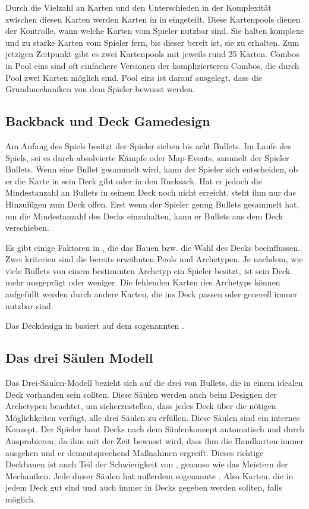 Durch die Vielzahl an Karten und den Unterschieden in der Komplexität zwischen diesen Karten werden Karten in \FF in  eingeteilt.
Diese Kartenpools dienen der Kontrolle, wann welche Karten vom Spieler nutzbar sind.
Sie halten komplexe und zu starke Karten vom Spieler fern, bis dieser bereit ist, sie zu erhalten.
Zum jetzigen Zeitpunkt gibt es zwei Kartenpools mit jeweils rund 25 Karten. Combos in Pool eins sind oft einfachere
Versionen der komplizierteren Combos, die durch Pool zwei Karten möglich sind.
Pool eins ist darauf ausgelegt, dass die Grundmechaniken von \FF dem Spieler bewusst werden.


\subsection{Backback und Deck Gamedesign}\label{subsec:placementMatters}

Am Anfang des Spiels besitzt der Spieler sieben bis acht Bullets. Im Laufe des Spiels, sei es durch absolvierte Kämpfe
oder Map-Events, sammelt der Spieler Bullets. Wenn eine Bullet gesammelt wird, kann der Spieler sich entscheiden,
ob er die Karte in sein Deck gibt oder in den Rucksack. Hat er jedoch die Mindestanzahl an Bullets in seinem Deck
noch nicht erreicht, steht ihm nur das Hinzufügen zum Deck offen. Erst wenn der Spieler genug Bullets gesammelt hat,
um die Mindestanzahl des Decks einzuhalten, kann er Bullets aus dem Deck verschieben.


Es gibt einige Faktoren in \FF, die das Bauen bzw. die Wahl des Decks beeinflussen. Zwei kriterien sind die bereits erwähnten Pools und Archetypen.
Je nachdem, wie viele Bullets von einem bestimmten Archetyp ein Spieler besitzt, ist sein Deck mehr ausgeprägt oder weniger.
Die fehlenden Karten des Archetyps können aufgefüllt werden durch andere Karten, die ins Deck passen oder generell immer nutzbar sind.


Das Deckdesign in \FF basiert auf dem sogenannten .


\subsection{Das drei Säulen Modell}\label{subsec:placementMatters}

Das Drei-Säulen-Modell bezieht sich auf die drei  von Bullets, die in einem idealen Deck vorhanden sein sollten.
Diese Säulen werden auch beim Designen der Archetypen beachtet, um sicherzustellen, dass jedes Deck über die nötigen
Möglichkeiten verfügt, alle drei Säulen zu erfüllen. Diese Säulen sind ein internes Konzept.
Der Spieler baut Decks nach dem Säulenkonzept automatisch und durch Ausprobieren, da ihm mit der Zeit bewusst wird,
dass ihm \zB die Handkarten immer ausgehen und er dementsprechend Maßnahmen ergreift. Dieses richtige Deckbauen
ist auch Teil der Schwierigkeit von \FF, genauso wie das Meistern der Mechaniken. Jede dieser Säulen hat außerdem sogenannte .
Also Karten, die in jedem Deck gut sind und auch immer in Decks gegeben werden sollten, falls möglich.


